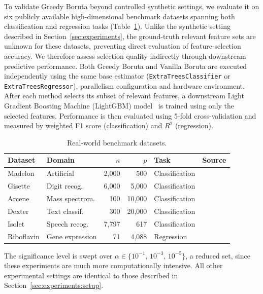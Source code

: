 \documentclass[runningheads]{llncs}
\begin{document}
To validate Greedy Boruta beyond controlled synthetic settings, we evaluate it on six publicly available high-dimensional benchmark datasets spanning both classification and regression tasks (Table~\ref{tab:realworld_datasets}). Unlike the synthetic setting described in Section~\ref{sec:experiments}, the ground-truth relevant feature sets are unknown for these datasets, preventing direct evaluation of feature-selection accuracy. We therefore assess selection quality indirectly through downstream predictive performance. Both Greedy Boruta and Vanilla Boruta are executed independently using the same base estimator (\texttt{ExtraTreesClassifier} or \texttt{ExtraTreesRegressor}), parallelism configuration and hardware environment. After each method selects its subset of relevant features, a downstream Light Gradient Boosting Machine (LightGBM) model~\cite{ke2017lightgbm} is trained using only the selected features. Performance is then evaluated using 5-fold cross-validation and measured by weighted F1 score (classification) and $R^2$ (regression).

 
\begin{table}
\centering
\caption{Real-world benchmark datasets.}
\label{tab:realworld_datasets}
\begin{tabular}{llrrll}
\toprule
Dataset    & Domain          & $n$    & $p$      & Task           & Source \\
\midrule
Madelon    & Artificial      & 2{,}000  & 500      & Classification & \cite{guyon2004result} \\
Gisette    & Digit recog.    & 6{,}000  & 5{,}000  & Classification & \cite{guyon2004result} \\
Arcene     & Mass spectrom.  & 100      & 10{,}000 & Classification & \cite{guyon2004result} \\
Dexter     & Text classif.   & 300      & 20{,}000 & Classification & \cite{guyon2004result} \\
Isolet     & Speech recog.   & 7{,}797  & 617      & Classification & \cite{uci2017} \\
Riboflavin & Gene expression & 71       & 4{,}088  & Regression     & \cite{buhlmann2014hdi} \\
\bottomrule
\end{tabular}
\end{table}

The significance level is swept over $\alpha \in \{10^{-1},\, 10^{-3},\, 10^{-5}\}$, a reduced set, since  these experiments are much more computationally intensive. All other experimental settings are identical to those described in Section~\ref{sec:experiments:setup}.
 
\end{document}
